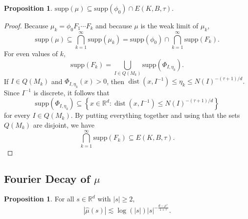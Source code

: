 \documentclass{amsart}
\numberwithin{equation}{section}
\theoremstyle{definition}
\newtheorem{prop}[theorem]{Proposition}
\theoremstyle{definition}
\def\RR{\mathbb{R}}
\def\supp{\mathrm{supp}}
\newcommand{\cbr}[1]{ \left\{ {#1} \right\} }
\DeclareMathOperator{\dist}{dist}
\begin{document}
\begin{prop}\label{support of mu lemma}
$\supp(\mu) \subseteq \supp(\phi_0) \cap E(K,B,\tau).$ 
\end{prop}
\begin{proof}
Because $\mu_k = \phi_0 F_{1} \cdots F_{k}$ and because $\mu$ is the weak limit of $\mu_k$,  
\[\supp (\mu) \subseteq \bigcap_{k=1}^{\infty} \supp (\mu_k) =  \supp(\phi_0) \cap \bigcap_{k=1}^{\infty} \supp (F_{k}).\]
%
%
%
For even values of $k$, 
$$\supp (F_k) = \bigcup_{I \in Q(M_k)} \supp(\Phi_{I, \eta_k}).$$
If $I \in Q(M_k)$ and $\Phi_{I, \eta_k}(x) > 0$, then 
$\dist(x,I^{-1}) \leq \eta_k \leq N(I)^{-(\tau+1)/d}.$  
Since $I^{-1}$ is discrete, it follows that 
$$
\supp(\Phi_{I,\eta_k}) \subseteq \cbr{x \in \RR^d : \dist(x,I^{-1}) \leq N(I)^{-(\tau+1)/d}} 
$$
for every $I \in Q(M_k)$. 
By putting everything together and using that the sets $Q(M_k)$ are disjoint, we have 
$$
\bigcap_{k=1}^{\infty} \supp(F_k) \subseteq E(K,B,\tau). 
$$
\end{proof}


\subsection{Fourier Decay of \texorpdfstring{$\mu$}{mu}}


\begin{prop}\label{Prop_mu_decay}
For all  $s \in \RR^d$ with $|s| \geq 2$, 
\begin{equation}\label{mu_decay}
|\widehat{\mu}(s)| \lesssim 
\log(|s|)|s|^{-\frac{d-\rho^+}{1 + \tau}}.
\end{equation}
\end{prop}
\end{document}
